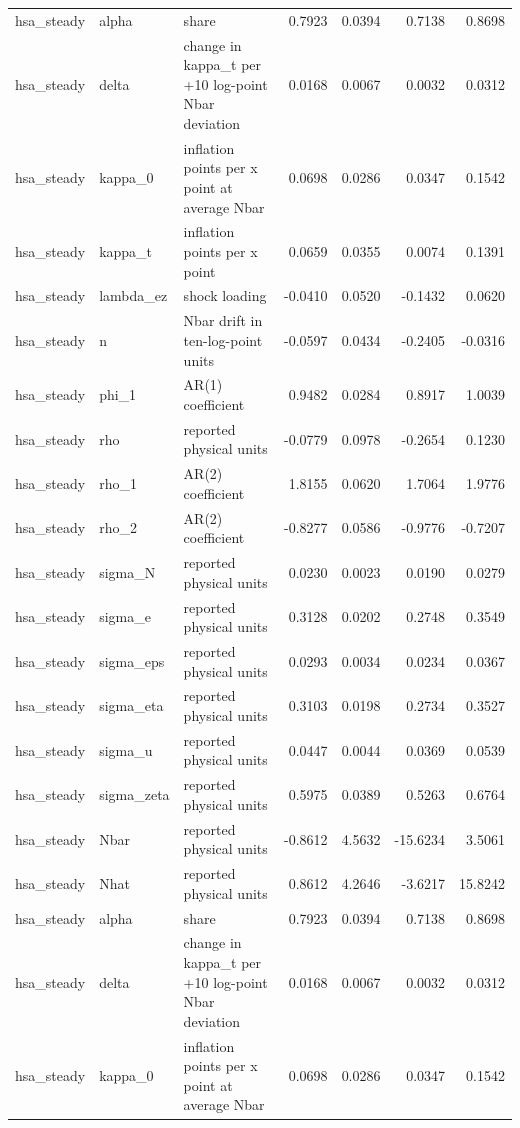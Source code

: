 \begin{tabular}{lllrrrr}
hsa\_steady & alpha & share & 0.7923 & 0.0394 & 0.7138 & 0.8698 \\
hsa\_steady & delta & change in kappa\_t per +10 log-point Nbar deviation & 0.0168 & 0.0067 & 0.0032 & 0.0312 \\
hsa\_steady & kappa\_0 & inflation points per x point at average Nbar & 0.0698 & 0.0286 & 0.0347 & 0.1542 \\
hsa\_steady & kappa\_t & inflation points per x point & 0.0659 & 0.0355 & 0.0074 & 0.1391 \\
hsa\_steady & lambda\_ez & shock loading & -0.0410 & 0.0520 & -0.1432 & 0.0620 \\
hsa\_steady & n & Nbar drift in ten-log-point units & -0.0597 & 0.0434 & -0.2405 & -0.0316 \\
hsa\_steady & phi\_1 & AR(1) coefficient & 0.9482 & 0.0284 & 0.8917 & 1.0039 \\
hsa\_steady & rho & reported physical units & -0.0779 & 0.0978 & -0.2654 & 0.1230 \\
hsa\_steady & rho\_1 & AR(2) coefficient & 1.8155 & 0.0620 & 1.7064 & 1.9776 \\
hsa\_steady & rho\_2 & AR(2) coefficient & -0.8277 & 0.0586 & -0.9776 & -0.7207 \\
hsa\_steady & sigma\_N & reported physical units & 0.0230 & 0.0023 & 0.0190 & 0.0279 \\
hsa\_steady & sigma\_e & reported physical units & 0.3128 & 0.0202 & 0.2748 & 0.3549 \\
hsa\_steady & sigma\_eps & reported physical units & 0.0293 & 0.0034 & 0.0234 & 0.0367 \\
hsa\_steady & sigma\_eta & reported physical units & 0.3103 & 0.0198 & 0.2734 & 0.3527 \\
hsa\_steady & sigma\_u & reported physical units & 0.0447 & 0.0044 & 0.0369 & 0.0539 \\
hsa\_steady & sigma\_zeta & reported physical units & 0.5975 & 0.0389 & 0.5263 & 0.6764 \\
hsa\_steady & Nbar & reported physical units & -0.8612 & 4.5632 & -15.6234 & 3.5061 \\
hsa\_steady & Nhat & reported physical units & 0.8612 & 4.2646 & -3.6217 & 15.8242 \\
hsa\_steady & alpha & share & 0.7923 & 0.0394 & 0.7138 & 0.8698 \\
hsa\_steady & delta & change in kappa\_t per +10 log-point Nbar deviation & 0.0168 & 0.0067 & 0.0032 & 0.0312 \\
hsa\_steady & kappa\_0 & inflation points per x point at average Nbar & 0.0698 & 0.0286 & 0.0347 & 0.1542 \\

\end{tabular}
